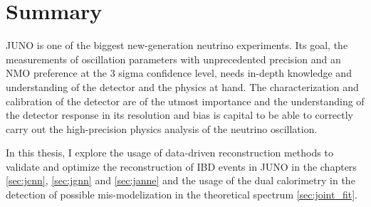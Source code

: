 \documentclass[../main.tex]{subfiles}
\begin{document}
\section{Summary}

JUNO is one of the biggest new-generation neutrino experiments. Its goal, the measurements of oscillation parameters with unprecedented precision and an NMO preference at the 3 sigma confidence level, needs in-depth knowledge and understanding of the detector and the physics at hand. The characterization and calibration of the detector are of the utmost importance and the understanding of the detector response in its resolution and bias is capital to be able to correctly carry out the high-precision physics analysis of the neutrino oscillation.

In this thesis, I explore the usage of data-driven reconstruction methods to validate and optimize the reconstruction of IBD events in JUNO in the chapters \ref{sec:jcnn}, \ref{sec:jgnn} and \ref{sec:janne} and the usage of the dual calorimetry in the detection of possible mis-modelization in the theoretical spectrum \ref{sec:joint_fit}.
\end{document}
